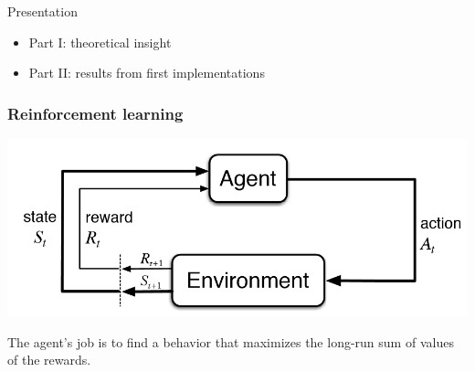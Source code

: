 \documentclass[dvipsnames,svgnames]{beamer}
\begin{document}
\begin{frame}{Presentation}
\begin{block}{}
\begin{itemize}
\item Part I: theoretical insight 
\item Part II: results from first implementations
\end{itemize}
\end{block}
\end{frame}

\begin{frame}
\frametitle{Reinforcement learning}
\centering
\includegraphics[scale=0.5]{img/RL_graph.png}
\vspace{1cm}

The agent's job is to find a behavior that maximizes the long-run sum of values of the rewards.
\end{frame}
\end{document}
